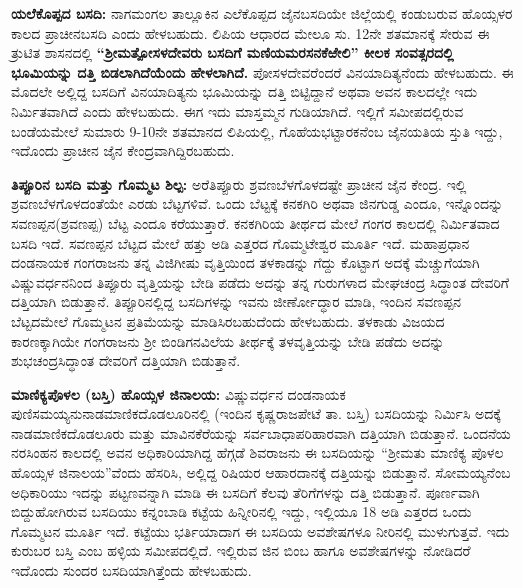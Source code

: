 \textbf{ಯಲೆಕೊಪ್ಪದ ಬಸದಿ: } ನಾಗಮಂಗಲ ತಾಲ್ಲೂಕಿನ ಎಲೆಕೊಪ್ಪದ ಜೈನಬಸದಿಯೇ ಜಿಲ್ಲೆಯಲ್ಲಿ ಕಂಡುಬರುವ ಹೊಯ್ಸಳರ ಕಾಲದ ಪ್ರಾಚೀನಬಸದಿ ಎಂದು ಹೇಳಬಹುದು. ಲಿಪಿಯ ಆಧಾರದ ಮೇಲೂ ಸು. 12ನೇ ಶತಮಾನಕ್ಕೆ ಸೇರುವ ಈ ತ್ರುಟಿತ ಶಾಸನದಲ್ಲಿ \textbf{“ಶ‍್ರೀಮತ್ಪೋಸಳದೇವರು ಬಸದಿಗೆ ಮಣಿಯಮರಸನಕೆಱೇಲಿ” ಕೀಲಕ ಸಂವತ್ಸರದಲ್ಲಿ ಭೂಮಿಯನ್ನು ದತ್ತಿ ಬಿಡಲಾಗಿದೆಯೆಂದು ಹೇಳಲಾಗಿದೆ.} ಪೋಸಳದೇವರೆಂದರೆ ವಿನಯಾದಿತ್ಯನೆಂದು ಹೇಳಬಹುದು. ಈ ಮೊದಲೇ ಅಲ್ಲಿದ್ದ ಬಸದಿಗೆ ವಿನಯಾದಿತ್ಯನು ಭೂಮಿಯನ್ನು ದತ್ತಿ ಬಿಟ್ಟಿದ್ದಾನೆ ಅಥವಾ ಅವನ ಕಾಲದಲ್ಲೇ ಇದು ನಿರ್ಮಿತವಾಗಿದೆ ಎಂದು ಹೇಳಬಹುದು. ಈಗ ಇದು ಮಾಸ್ತಮ್ಮನ ಗುಡಿಯಾಗಿದೆ. ಇಲ್ಲಿಗೆ ಸಮೀಪದಲ್ಲಿರುವ ಬಂಡೆಯಮೇಲೆ ಸುಮಾರು 9-10ನೇ ಶತಮಾನದ ಲಿಪಿಯಲ್ಲಿ, ಗೊಹೆಯಭಟ್ಟಾರಕನೆಂಬ ಜೈನಯತಿಯ ಸ್ತುತಿ ಇದ್ದು, ಇದೊಂದು ಪ್ರಾಚೀನ ಜೈನ ಕೇಂದ್ರವಾಗಿದ್ದಿರಬಹುದು.

\textbf{ತಿಪ್ಪೂರಿನ ಬಸದಿ ಮತ್ತು ಗೊಮ್ಮಟ ಶಿಲ್ಪ:} ಅರೆತಿಪ್ಪೂರು ಶ್ರವಣಬೆಳಗೊಳದಷ್ಟೇ ಪ್ರಾಚೀನ ಜೈನ ಕೇಂದ್ರ. ಇಲ್ಲಿ ಶ್ರವಣಬೆಳಗೊಳದಂತೆಯೇ ಎರಡು ಬೆಟ್ಟಗಳಿವೆ. ಒಂದು ಬೆಟ್ಟಕ್ಕೆ ಕನಕಗಿರಿ ಅಥವಾ ಜಿನಗುಡ್ಡ ಎಂದೂ, ಇನ್ನೊಂದನ್ನು ಸವಣಪ್ಪನ(ಶ್ರವಣಪ್ಪ) ಬೆಟ್ಟ ಎಂದೂ ಕರೆಯುತ್ತಾರೆ. ಕನಕಗಿರಿಯ ತೀರ್ಥದ ಮೇಲೆ ಗಂಗರ ಕಾಲದಲ್ಲಿ ನಿರ್ಮಿತವಾದ ಬಸದಿ ಇದೆ. ಸವಣಪ್ಪನ ಬೆಟ್ಟದ ಮೇಲೆ ಹತ್ತು ಅಡಿ ಎತ್ತರದ ಗೊಮ್ಮಟೇಶ್ವರ ಮೂರ್ತಿ ಇದೆ. ಮಹಾಪ್ರಧಾನ ದಂಡನಾಯಕ ಗಂಗರಾಜನು ತನ್ನ ವಿಜಿಗೀಷು ವೃತ್ತಿಯಿಂದ ತಳಕಾಡನ್ನು ಗೆದ್ದು ಕೊಟ್ಟಾಗ ಅದಕ್ಕೆ ಮೆಚ್ಚುಗೆಯಾಗಿ ವಿಷ್ಣುವರ್ಧನನಿಂದ ತಿಪ್ಪೂರು ವೃತ್ತಿಯನ್ನು ಬೇಡಿ ಪಡೆದು ಅದನ್ನು ತನ್ನ ಗುರುಗಳಾದ ಮೇಘಚಂದ್ರ ಸಿದ್ಧಾಂತ ದೇವರಿಗೆ ದತ್ತಿಯಾಗಿ ಬಿಡುತ್ತಾನೆ. ತಿಪ್ಪೂರಿನಲ್ಲಿದ್ದ ಬಸದಿಗಳನ್ನು ಇವನು ಜೀರ್ಣೋದ್ಧಾರ ಮಾಡಿ, ಇಂದಿನ ಸವಣಪ್ಪನ ಬೆಟ್ಟದಮೇಲೆ ಗೊಮ್ಮಟನ ಪ್ರತಿಮೆಯನ್ನು ಮಾಡಿಸಿರಬಹುದೆಂದು ಹೇಳಬಹುದು. ತಳಕಾಡು ವಿಜಯದ ಕಾರಣಕ್ಕಾಗಿಯೇ ಗಂಗರಾಜನು ಶ‍್ರೀ ಬಿಂಡಿಗನವಿಲೆಯ ತೀರ್ಥಕ್ಕೆ ತಳವೃತ್ತಿಯನ್ನು ಬೇಡಿ ಪಡೆದು ಅದನ್ನು ಶುಭಚಂದ್ರಸಿದ್ಧಾಂತ ದೇವರಿಗೆ ದತ್ತಿಯಾಗಿ ಬಿಡುತ್ತಾನೆ.

\textbf{ಮಾಣಿಕ್ಯಪೊಳಲ (ಬಸ್ತಿ) ಹೊಯ್ಸಳ ಜಿನಾಲಯ:} ವಿಷ್ಣುವರ್ಧನ ದಂಡನಾಯಕ ಪುಣಿಸಮಯ್ಯನು\break ನಾಡಮಾಣಿಕದೊಡಲೂರಿನಲ್ಲಿ (ಇಂದಿನ ಕೃಷ್ಣರಾಜಪೇಟೆ ತಾ. ಬಸ್ತಿ) ಬಸದಿಯನ್ನು ನಿರ್ಮಿಸಿ ಅದಕ್ಕೆ ನಾಡಮಾಣಿಕದೊಡಲೂರು ಮತ್ತು ಮಾವಿನಕೆರೆಯನ್ನು ಸರ್ವಬಾಧಾಪರಿಹಾರವಾಗಿ ದತ್ತಿಯಾಗಿ ಬಿಡುತ್ತಾನೆ. ಒಂದನೆಯ ನರಸಿಂಹನ ಕಾಲದಲ್ಲಿ ಅವನ ಅಧಿಕಾರಿಯಾಗಿದ್ದ ಹೆಗ್ಗಡೆ ಶಿವರಾಜನು ಈ ಬಸದಿಯನ್ನು “ಶ‍್ರೀಮತು ಮಾಣಿಕ್ಯ ಪೊಳಲ ಹೊಯ್ಸಳ ಜಿನಾಲಯ”ವೆಂದು ಹೆಸರಿಸಿ, ಅಲ್ಲಿದ್ದ ರಿಷಿಯರ ಆಹಾರದಾನಕ್ಕೆ ದತ್ತಿಯನ್ನು ಬಿಡುತ್ತಾನೆ. ಸೋಮಯ್ಯನೆಂಬ ಅಧಿಕಾರಿಯು ಇದನ್ನು ಪಟ್ಟಣವನ್ನಾಗಿ ಮಾಡಿ ಈ ಬಸದಿಗೆ ಕೆಲವು ತೆರಿಗೆಗಳನ್ನು ದತ್ತಿ ಬಿಡುತ್ತಾನೆ. ಪೂರ್ಣವಾಗಿ ಬಿದ್ದುಹೋಗಿರುವ ಬಸದಿಯು ಕನ್ನಂಬಾಡಿ ಕಟ್ಟೆಯ ಹಿನ್ನೀರಿನಲ್ಲಿ ಇದ್ದು, ಇಲ್ಲಿಯೂ 18 ಅಡಿ ಎತ್ತರದ ಒಂದು ಗೊಮ್ಮಟನ ಮೂರ್ತಿ ಇದೆ. ಕಟ್ಟೆಯು ಭರ್ತಿಯಾದಾಗ ಈ ಬಸದಿಯ ಅವಶೇಷಗಳೂ ನೀರಿನಲ್ಲಿ ಮುಳುಗುತ್ತವೆ. ಇದು ಕುರುಬರ ಬಸ್ತಿ ಎಂಬ ಹಳ್ಳಿಯ ಸಮೀಪದಲ್ಲಿದೆ. ಇಲ್ಲಿರುವ ಜಿನ ಬಿಂಬ ಹಾಗೂ ಅವಶೇಷಗಳನ್ನು ನೋಡಿದರೆ ಇದೊಂದು ಸುಂದರ ಬಸದಿಯಾಗಿತ್ತೆಂದು ಹೇಳಬಹುದು.

